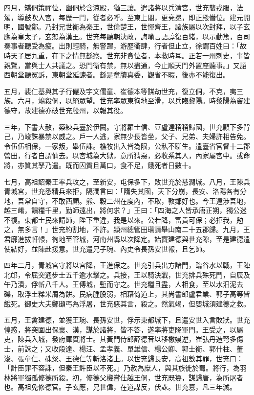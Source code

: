 \begin{pinyinscope}
 四月，矯侗策禪位，幽侗於含涼殿，猶三讓。遣諸將以兵清宮，世充襲戎服，法駕，導鼓吹入宮，每歷一門，從者必呼。至東上閤，更兗冕，即正殿僭位。建元開明，國號鄭。乃封兄世衡為秦王，世偉楚王，世惲齊王，諸族屬以次封拜，以子玄應為皇太子，玄恕為漢王。世充每聽朝決政，誨喻言語諄復百緒，以示勤篤，百司奏事者聽受為疲。出則輕騎，無警蹕，游歷衢肆，行者但止立，徐謂百姓曰：「故時天子居九重，在下之情無繇察。世充非貪位者，本救時耳。正若一州刺史，事皆親覽，當與士人共議之。恐門衛有禁，無以盡通，今止順天門外置座聽事。」又詔西朝堂聽冤訴，東朝堂延諫者。繇是章牘真委，觀省不暇，後亦不能復出。



 五月，裴仁基與其子行儼及宇文儒童、崔德本等謀劫世充，復立侗，不克，夷三族。六月，鴆殺侗，以絕眾望。世充率眾東徇地至滑，以兵臨黎陽。時黎陽為竇建德守，故建德亦破世充殷州，以報其役。



 三年，下書大赦，築練兵臺於伊闕。守將羅士信、豆盧達稍稍歸國，世充顧下多背己，乃峻誅暴禁以威之。戶一人逃，家無少長皆坐，父子、兄弟、夫婦許相告免。令伍伍相保，一家叛，舉伍誅。樵牧出入皆為限，公私不聊生。遣臺省官督十二郡營田，行者自謂仙去。以宮城為大獄，意所猜惡，必收系其人，內家屬宮中。或命將，亦質其孥乃遣。既而囚質且萬口，食不足，餓死者日數十。



 七月，高祖詔秦王率兵攻之，至新安，屯保多下，敗世充於慈澗城。八月，王陳兵青城宮，世充悉精兵來拒，隔澗言曰：「隋失其國，天下分崩，長安、洛陽各有分地，吾常自守，不敢西顧。熊、穀二州在度內，不取，敦鄰好也。今王遠涉吾地，越三崤，饋糧千里，勤師遠出，將何求？」王曰：「四海之人皆承唐正朔，獨公迷不復。東都士民來請師，陛下重違，我是以來。公若降，富貴可保；必拒我，勉之，無多言！」世充約割地，不許。潁州總管田瓚請舉山南二十五郡歸。九月，王君廓進拔軒轅，徇地至管城，河南州縣以次降定。始竇建德與世充隙，至是建德遣使結好，並陳赴援意。世充遣兄子琬、內史令長孫安世報，且乞師。



 四年二月，青城宮守將以宮降，王進保之。世充引兵出方諸門，臨谷水以戰，王陣北邙，令屈突通步士五千逾水擊之。兵接，王以騎決戰，世充排兵殊死鬥，自辰及午乃潰，俘斬八千人。王傅城，塹而守之。世充糧且盡，人相食，至以水汨泥去礫，取浮土糅米屑為餅。民病腫股弱，相藉倚道上，其尚書郎盧君業、郭子高等皆餓死。御史大夫鄭頲丐為浮屠，世充惡其言，殺之。然氣竭，但嬰城須建德之救。



 五月，王禽建德，並獲王琬、長孫安世，俘示東都城下，且遣安世入言敗狀。世充惶惑，將突圍出保襄、漢，謀於諸將，皆不答，遂率將吏降軍門。王受之，以屬吏，陳兵入城，發府庫賚將士。其黃門侍郎薛德音以移檄嫚逆，崔弘丹造弩多傷士，前誅之；又收段達、楊汪、孟孝義、單雄信、楊公卿、郭士衡、郭什柱、董浚、張童仁、硃粲、王德仁等斬洛渚上。以世充歸長安，高祖數其罪，世充曰：「計臣罪不容誅，但秦王許臣以不死。」乃赦為庶人，與其族徙於蜀。將行，為羽林將軍獨孤修德所殺。初，修德父機嘗仕越王侗，世充既篡，謀歸唐，為所屠者也。高祖免修德官。子玄應，兄世偉，在道謀反，伏誅。世充篡，凡三年滅。




\end{pinyinscope}
